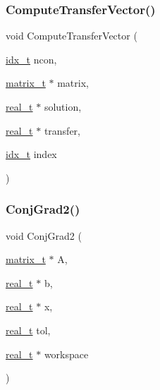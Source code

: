 \subsubsection{\texorpdfstring{Compute\+Transfer\+Vector()}{ComputeTransferVector()}}
{\footnotesize\ttfamily void Compute\+Transfer\+Vector (\begin{DoxyParamCaption}\item[{\hyperlink{a00876_aaa5262be3e700770163401acb0150f52}{idx\+\_\+t}}]{ncon,  }\item[{\hyperlink{a00754}{matrix\+\_\+t} $\ast$}]{matrix,  }\item[{\hyperlink{a00876_a1924a4f6907cc3833213aba1f07fcbe9}{real\+\_\+t} $\ast$}]{solution,  }\item[{\hyperlink{a00876_a1924a4f6907cc3833213aba1f07fcbe9}{real\+\_\+t} $\ast$}]{transfer,  }\item[{\hyperlink{a00876_aaa5262be3e700770163401acb0150f52}{idx\+\_\+t}}]{index }\end{DoxyParamCaption})}

\mbox{\label{a00353_a31c811c3b724d9d26416be8831be44e0}} 
\subsubsection{\texorpdfstring{Conj\+Grad2()}{ConjGrad2()}}
{\footnotesize\ttfamily void Conj\+Grad2 (\begin{DoxyParamCaption}\item[{\hyperlink{a00754}{matrix\+\_\+t} $\ast$}]{A,  }\item[{\hyperlink{a00876_a1924a4f6907cc3833213aba1f07fcbe9}{real\+\_\+t} $\ast$}]{b,  }\item[{\hyperlink{a00876_a1924a4f6907cc3833213aba1f07fcbe9}{real\+\_\+t} $\ast$}]{x,  }\item[{\hyperlink{a00876_a1924a4f6907cc3833213aba1f07fcbe9}{real\+\_\+t}}]{tol,  }\item[{\hyperlink{a00876_a1924a4f6907cc3833213aba1f07fcbe9}{real\+\_\+t} $\ast$}]{workspace }\end{DoxyParamCaption})}

